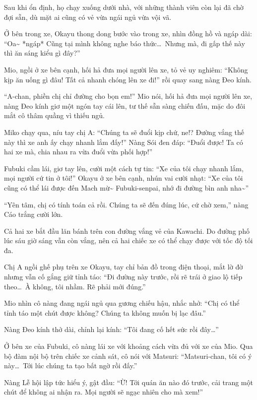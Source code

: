 \documentclass[../main.tex]{subfiles}
\begin{document}
\ct

Sau khi ổn định, họ chạy xuống dưới nhà, với những thành viên còn lại đã chờ đợi sẵn, dù mặt ai cũng có vẻ vừa ngái ngủ vừa vội vã.

Ở bên trong xe, Okayu thong dong bước vào trong xe, nhìn đồng hồ và ngáp dài: ``Oa\~{} *ngáp* Cũng tại mình không nghe báo thức\dots\ Nhưng mà, đi gấp thế này thì ăn sáng kiểu gì đây?''

Mio, ngồi ở xe bên cạnh, hối hả đưa mọi người lên xe, tỏ vẻ uy nghiêm: ``Không kịp ăn uống gì đâu! Tất cả nhanh chóng lên xe đi!'' rồi quay sang nàng Đeo kính.

``A-chan, phiền chị chỉ đường cho bọn em!'' Mio nói, hối hả đưa mọi người lên xe, nàng Đeo kính giơ một ngón tay cái lên, tư thế sẵn sàng chiến đấu, mặc do đôi mắt cô thâm quầng vì thiếu ngủ.

Miko chạy qua, níu tay chị A: ``Chúng ta sẽ đuổi kịp chứ, ne!? Đường vắng thế này thì xe anh ấy chạy nhanh lắm đấy!'' Nàng Sói đen đáp: ``Đuổi được! Ta có hai xe mà, chia nhau ra vừa đuổi vừa phối hợp!''

Fubuki cầm lái, giơ tay lên, cười một cách tự tin: ``Xe của tôi chạy nhanh lắm, mọi người cứ tin ở tôi!'' Okayu ở xe bên cạnh, nhún vai cười nhạt: ``Xe của tôi cũng có thể lái được đến Mach mừ\~{} Fubuki-senpai, nhớ đi đường bìn anh nha\~{}''

``Yên tâm, chị có tính toán cả rồi. Chúng ta sẽ đến đúng lúc, cứ chờ xem,'' nàng Cáo trắng cười lớn.

\ct

Cả hai xe bắt đầu lăn bánh trên con đường vắng vẻ của Kawachi. Do đường phố lúc sáu giờ sáng vẫn còn vắng, nên cả hai chiếc xe có thể chạy được với tốc độ tối đa.

Chị A ngồi ghế phụ trên xe Okayu, tay chỉ bản đồ trong điện thoại, mắt lờ đờ nhưng vẫn cố gắng giữ tỉnh táo: ``Đi đường này trước, rồi rẽ trái ở giao lộ tiếp theo\dots\ À không, tôi nhầm. Rẽ phải mới đúng.''

Mio nhìn cô nàng đang ngái ngủ qua gương chiếu hậu, nhắc nhở: ``Chị có thể tỉnh táo một chút được không? Chúng ta không muốn bị lạc đâu.''

Nàng Đeo kính thở dài, chỉnh lại kính: ``Tôi đang cố hết sức rồi đây\dots''

Ở bên xe của Fubuki, cô nàng lái xe với khoảng cách vừa đủ với xe của Mio. Qua bộ đàm nội bộ trên chiếc xe cảnh sát, cô nói với Matsuri: ``Matsuri-chan, tôi có ý này\dots\ Tới lúc chúng ta tạo bất ngờ rồi đấy.''

Nàng Lễ hội lập tức hiểu ý, gật đầu: ``Ừ! Tới quán ăn nào đó trước, cải trang một chút để không ai nhận ra. Mọi người sẽ ngạc nhiên cho mà xem!''
\end{document}
